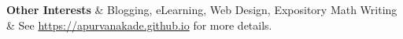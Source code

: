 \textbf{Other Interests}
& Blogging, eLearning, Web Design, Expository Math Writing\\ 
& See \url{https://apurvanakade.github.io} for more details.